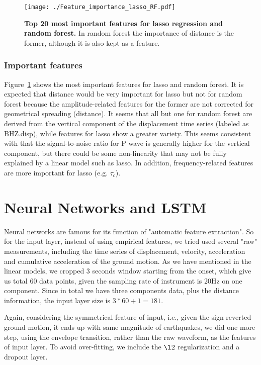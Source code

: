 \documentclass{article} %
\begin{document}
\begin{figure}[ht!]
	\centering
	\texttt{[image: ./Feature\_importance\_lasso\_RF.pdf]}
	\caption{{\bf Top 20 most important features for lasso regression and random forest.} In random forest the importance of distance is the former, although it is also kept as a feature.}\label{Feature_importance_lasso_RF} 
\end{figure}

\subsubsection{Important features}
Figure~\ref{Feature_importance_lasso_RF} shows the most important features for lasso and random forest. It is expected that distance would be very important for lasso but not for random forest because the amplitude-related features for the former are not corrected for geometrical spreading (distance). It seems that all but one for random forest are derived from the vertical component of the displacement time series (labeled as BHZ.disp), while features for lasso show a greater variety. This seems consistent with that the signal-to-noise ratio for P wave is generally higher for the vertical component, but there could be some non-linearity that may not be fully explained by a linear model such as lasso. In addition, frequency-related features are more important for lasso (e.g. $\tau_c$).  

\section{Neural Networks and LSTM}
Neural networks are famous for its function of "automatic feature extraction". So for the input layer, instead of using empirical features, we tried used several "raw" measurements, including the time series of displacement, velocity, acceleration and cumulative acceleration of the ground motion. As we have mentioned in the linear models, we cropped 3 seconds window starting from the onset, which give us total 60 data points, given the sampling rate of instrument is 20Hz on one component. Since in total we have three components data, plus the distance information, the input layer size is $3*60 + 1 = 181$. 

Again, considering the symmetrical feature of input, i.e., given the sign reverted ground motion, it ends up with same magnitude of earthquakes, we did one more step, using the envelope transition, rather than the raw waveform, as the features of input layer. To avoid over-fitting, we include the $\l2$ regularization and a dropout layer.
\end{document}
